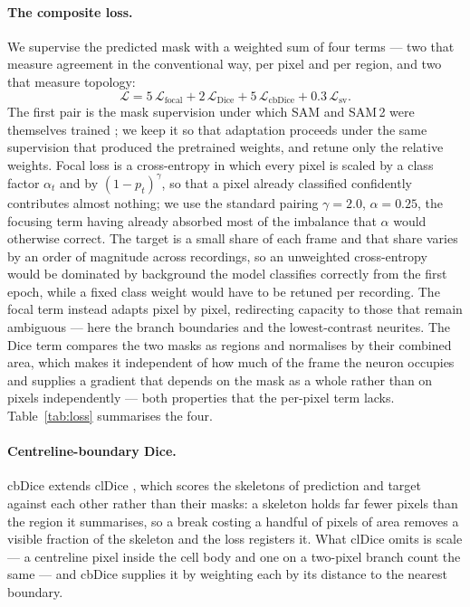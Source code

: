 \paragraph{The composite loss.}
We supervise the predicted mask with a weighted sum of four terms --- two
that measure agreement in the conventional way, per pixel and per region,
and two that measure topology:
\begin{equation}
\mathcal{L} = 5\,\mathcal{L}_{\text{focal}} + 2\,\mathcal{L}_{\text{Dice}}
 + 5\,\mathcal{L}_{\text{cbDice}} + 0.3\,\mathcal{L}_{\text{sv}} .
\label{eq:loss}
\end{equation}
The first pair is the mask supervision under which SAM and SAM\,2 were
themselves trained \cite{kirillov2023sam,ravi2025sam2}; we keep it so that
adaptation proceeds under the same supervision that produced the pretrained
weights, and retune only the relative weights. Focal loss
\cite{lin2017focal} is a cross-entropy in which every pixel is scaled by a
class factor $\alpha_t$ and by $(1-p_t)^{\gamma}$, so that a pixel already
classified confidently contributes almost nothing; we use the standard
pairing $\gamma = 2.0$, $\alpha = 0.25$, the focusing term having already
absorbed most of the imbalance that $\alpha$ would otherwise correct. The
target is a small share of each frame and that share varies by an order of
magnitude across recordings, so an unweighted cross-entropy would be
dominated by background the model classifies correctly from the first epoch,
while a fixed class weight would have to be retuned per recording. The focal
term instead adapts pixel by pixel, redirecting capacity to those that
remain ambiguous --- here the branch boundaries and the lowest-contrast
neurites. The
Dice term \cite{milletari2016vnet} compares the two masks as regions and
normalises by their combined area, which makes it independent of how much of
the frame the neuron occupies and supplies a gradient that depends on the
mask as a whole rather than on pixels independently --- both properties that
the per-pixel term lacks. Table~\ref{tab:loss} summarises the four.

\paragraph{Centreline-boundary Dice.}
cbDice \cite{shi2024cbdice} extends clDice \cite{shit2021cldice}, which
scores the skeletons of prediction and target against each other rather than
their masks: a skeleton holds far fewer pixels than the region it
summarises, so a break costing a handful of pixels of area removes a visible
fraction of the skeleton and the loss registers it. What clDice omits is
scale --- a centreline pixel inside the cell body and one on a two-pixel
branch count the same --- and cbDice supplies it by weighting each by its
distance to the nearest boundary.

